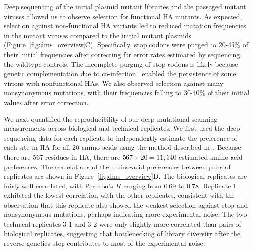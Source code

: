 \documentclass[9pt,twocolumn,twoside]{pnas-new}
\begin{document}
Deep sequencing of the initial plasmid mutant libraries and the passaged mutant viruses allowed us to observe selection for functional HA mutants.
As expected, selection against non-functional HA variants led to reduced mutation frequencies in the mutant viruses compared to the initial mutant plasmids (Figure~\ref{fig:dms_overview}C).
Specifically, stop codons were purged to 20-45\% of their initial frequencies after correcting for error rates estimated by sequencing the wildtype controls.
The incomplete purging of stop codons is likely because genetic complementation due to co-infection~\cite{marshall2013influenza} enabled the persistence of some virions with nonfunctional HAs. 
We also observed selection against many nonsynonymous mutations, with their frequencies falling to 30-40\% of their initial values after error correction.

We next quantified the reproducibility of our deep mutational scanning measurements across biological and technical replicates. 
We first used the deep sequencing data for each replicate to independently estimate the preference of each site in HA for all 20 amino acids using the method described in~\cite{bloom2015software}.
Because there are 567 residues in HA, there are $567 \times 20 = 11,340$ estimated amino-acid preferences.
The correlations of the amino-acid preferences between pairs of replicates are shown in Figure~\ref{fig:dms_overview}D.
The biological replicates are fairly well-correlated, with Pearson's $R$ ranging from 0.69 to 0.78. 
Replicate 1 exhibited the lowest correlation with the other replicates, consistent with the observation that this replicate also showed the weakest selection against stop and nonsynonymous mutations, perhaps indicating more experimental noise.
The two technical replicates 3-1 and 3-2 were only slightly more correlated than pairs of biological replicates, suggesting that bottlenecking of library diversity after the reverse-genetics step contributes to most of the experimental noise.
\end{document}

